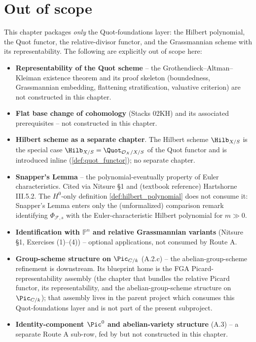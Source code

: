 \section{Out of scope}
\label{sec:quot_out_of_scope}

This chapter packages \emph{only} the Quot-foundations layer: the Hilbert
polynomial, the Quot functor, the relative-divisor functor, and the
Grassmannian scheme with its representability. The following are explicitly
out of scope here:
\begin{itemize}
  \item \textbf{Representability of the Quot scheme} -- the
    Grothendieck--Altman--Kleiman existence theorem and its proof skeleton
    (boundedness, Grassmannian embedding, flattening stratification,
    valuative criterion) are not constructed in this chapter.
  \item \textbf{Flat base change of cohomology} (Stacks 02KH) and its
    associated prerequisites -- not constructed in this chapter.
  \item \textbf{Hilbert scheme as a separate chapter}. The Hilbert scheme
    \(\Hilb_{X/S}\) is the special case
    \(\Hilb_{X/S} = \Quot_{\mathcal{O}_X/X/S}\) of the Quot functor and is
    introduced inline (\cref{def:quot_functor}); no separate chapter.
  \item \textbf{Snapper's Lemma} -- the polynomial-eventually property of
    Euler characteristics. Cited via Nitsure \S 1 and (textbook reference)
    Hartshorne III.5.2. The \(H^0\)-only definition
    \cref{def:hilbert_polynomial} does not consume it: Snapper's Lemma enters
    only the (unformalized) comparison remark identifying
    \(\Phi_{\mathcal{F},s}\) with the Euler-characteristic Hilbert polynomial
    for \(m \gg 0\).
  \item \textbf{Identification with \(\mathbb{P}^n\) and relative
    Grassmannian variants} (Nitsure \S 1, Exercises (1)--(4)) --
    optional applications, not consumed by Route A.
  \item \textbf{Group-scheme structure on \(\Pic_{C/k}\)} (A.2.c) -- the
    abelian-group-scheme refinement is downstream. Its blueprint home is the
    FGA Picard-representability assembly (the chapter that bundles the relative
    Picard functor, its representability, and the abelian-group-scheme
    structure on \(\Pic_{C/k}\)); that assembly lives in the parent project
    which consumes this Quot-foundations layer and is not part of the present
    subproject.
  \item \textbf{Identity-component \(\Pic^0\) and abelian-variety
    structure} (A.3) -- a separate Route A sub-row, fed by but not
    constructed in this chapter.
\end{itemize}
